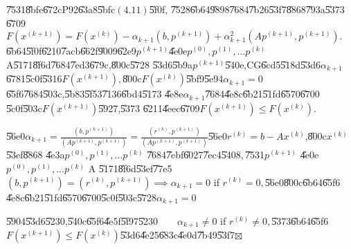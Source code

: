 \documentclass{article}
\begin{document}
\U{7531}\U{8bfe}\U{672c}P92\U{63a8}\U{5bfc}$\left( 4.11\right) $\U{5f0f},%
\U{7528}\U{6b64}\U{9898}\U{7684}\U{7b26}\U{53f7}\U{8868}\U{793a}\U{5373}%
\U{6709}$F\left( x^{\left( k+1\right) }\right) =F\left( x^{\left( k\right)
}\right) -\alpha _{k+1}\left( b,p^{\left( k+1\right) }\right) +\alpha
_{k+1}^{2}\left( Ap^{\left( k+1\right) },p^{\left( k+1\right) }\right) .$%
\U{6b64}\U{5f0f}\U{6210}\U{7acb}\U{662f}\U{9009}\U{62e9}$p^{\left(
k+1\right) }$\U{4e0e}$p^{\left( 0\right) },p^{\left( 1\right) },...p^{\left(
k\right) }$ A\U{5171}\U{8f6d}\U{7684}\U{7ed3}\U{679c},\U{800c}\U{5728}%
\U{53d6}\U{5b9a}$p^{\left( k+1\right) }$\U{540e},CG\U{6cd5}\U{518d}\U{53d6}$%
\alpha _{k+1}$\U{6781}\U{5c0f}\U{5316}$F\left( x^{\left( k+1\right) }\right)
,$\U{800c}$F\left( x^{\left( k\right) }\right) $\U{5bf9}\U{5e94}$\alpha
_{k+1}=0$\U{65f6}\U{7684}\U{503c},\U{5b83}\U{5f53}\U{7136}\U{6bd4}\U{5173}%
\U{4e8e}$\alpha _{k+1}$\U{7684}\U{4e8c}\U{6b21}\U{51fd}\U{6570}\U{6700}%
\U{5c0f}\U{503c}$F\left( x^{\left( k+1\right) }\right) $\U{5927},\U{5373}%
\U{6211}\U{4eec}\U{6709}$F\left( x^{\left( k+1\right) }\right) \leq F\left(
x^{\left( k\right) }\right) .$

\U{56e0}$\alpha _{k+1}=\frac{\left( b,p^{\left( k+1\right) }\right) }{\left(
Ap^{\left( k+1\right) },p^{\left( k+1\right) }\right) }=\frac{\left(
r^{\left( k\right) },p^{\left( k+1\right) }\right) }{\left( Ap^{\left(
k+1\right) },p^{\left( k+1\right) }\right) }$\U{56e0}$r^{\left( k\right)
}=b-Ax^{\left( k\right) }$,\U{800c}$x^{\left( k\right) }$\U{53ef}\U{8868}%
\U{4e3a}$p^{\left( 0\right) },p^{\left( 1\right) },...p^{\left( k\right) }$%
\U{7684}\U{7ebf}\U{6027}\U{7ec4}\U{5408}$,$\U{7531}$p^{\left( k+1\right) }$%
\U{4e0e}$p^{\left( 0\right) },p^{\left( 1\right) },...p^{\left( k\right) }$ A%
\U{5171}\U{8f6d}\U{53ef}\U{77e5}$\left( b,p^{\left( k+1\right) }\right)
=\left( r^{\left( k\right) },p^{\left( k+1\right) }\right) \implies \alpha
_{k+1}=0$ if $r^{\left( k\right) }=0,$\U{56e0}\U{800c}\U{6b64}\U{65f6}%
\U{4e8c}\U{6b21}\U{51fd}\U{6570}\U{6700}\U{5c0f}\U{503c}\U{5728}$\alpha
_{k+1}=0$

\U{5904}\U{53d6}\U{5230},\U{540c}\U{65f6}\U{4e5f}\U{5f97}\U{5230}$\qquad
\alpha _{k+1}\neq 0$ if $r^{\left( k\right) }\neq 0,$\U{5373}\U{6b64}\U{65f6}%
$F\left( x^{\left( k+1\right) }\right) \leq F\left( x^{\left( k\right)
}\right) $\U{53d6}\U{4e25}\U{683c}\U{4e0d}\U{7b49}\U{53f7}$\boxtimes $
\end{document}
